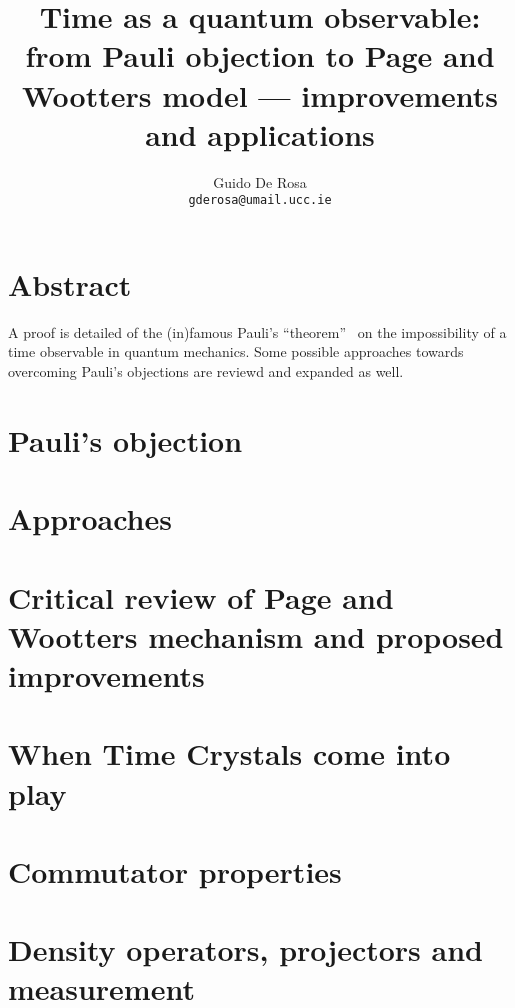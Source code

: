 \documentclass{book}
\author{Guido De Rosa \\ \small\tt{gderosa@umail.ucc.ie}}
\title{Time as a quantum observable: from Pauli objection to Page and Wootters model --- improvements and applications}
\begin{document}
\maketitle

\tableofcontents

\chapter*{Abstract}
A proof is detailed of the (in)famous Pauli's ``theorem''~\cite{PauliFootnote}
on the impossibility of a time observable in quantum mechanics. Some possible
approaches towards overcoming Pauli's objections are reviewd and expanded as well.

\chapter{Pauli's objection}



\chapter{Approaches}


\chapter{Critical review of Page and Wootters mechanism and proposed improvements}


\chapter{When Time Crystals come into play}


\appendix
\chapter{Commutator properties}

\chapter{Density operators, projectors and measurement}




\end{document}
